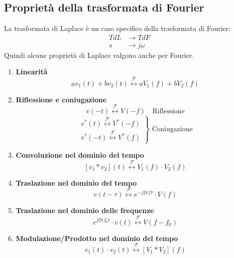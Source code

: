 \documentclass[a4paper]{article}
\begin{document}
\subsection{Proprietà della trasformata di Fourier}
La trasformata di Laplace è un caso specifico della trasformata di Fourier:
\[
\begin{aligned}
  TdL &\to TdF\\
  s &\to j \omega
\end{aligned}
\] 
Quindi alcune proprietà di Laplace valgono anche per Fourier.
\begin{enumerate}
  \item \textbf{Linearità}
    \[
      a v_1(t) + b v_2(t) \stackrel{\mathcal{F}}{\leftrightarrow} a V_1(f) + b V_2(f)
    \] 

  \item \textbf{Riflessione e coniugazione}
    \[
      v(-t) \stackrel{\mathcal{F}}{\leftrightarrow} V(-f) \quad \text{Riflessione}
    \] 
    \[
      \left.
      \begin{aligned}
        v^*(t) \stackrel{\mathcal{F}}{\leftrightarrow} V^*(-f)\\
        v^*(-t) \stackrel{\mathcal{F}}{\leftrightarrow} V^*(f)
      \end{aligned}
    \right\}
    \text{ Coniugazione}
    \]

  \item \textbf{Convoluzione nel dominio del tempo}
    \[
      \left[ v_1 \ast v_2 \right](t) \stackrel{\mathcal{F}}{\leftrightarrow} V_1(f) \cdot V_2(f)
    \] 

  \item \textbf{Traslazione nel dominio del tempo}
    \[
      v(t - \tau) \stackrel{\mathcal{F}}{\leftrightarrow} e^{-j 2 \pi f \tau} \cdot V(f)
    \] 

  \item \textbf{Traslazione nel dominio delle frequenze}
    \[
      e^{j 2 \pi f_0 t} \cdot v(t) \stackrel{\mathcal{F}}{\leftrightarrow} V(f - f_0)
    \]

  \item \textbf{Modulazione/Prodotto nel dominio del tempo}
    \[
      v_1(t) \cdot v_2(t) \stackrel{\mathcal{F}}{\leftrightarrow} \left[ V_1 \ast V_2 \right](f)
    \]
\end{enumerate}
\end{document}
